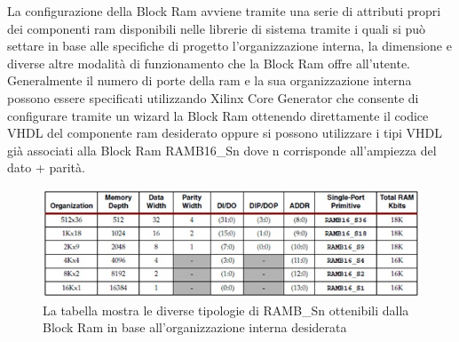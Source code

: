 La configurazione della Block Ram avviene tramite una serie di attributi propri dei componenti ram disponibili nelle librerie di sistema tramite i quali si pu\`o settare in base alle specifiche di progetto l'organizzazione interna, la dimensione e diverse altre modalità di funzionamento che la Block Ram offre all'utente.\\
Generalmente il numero di porte della ram e la sua organizzazione interna possono essere specificati utilizzando Xilinx Core Generator che consente di configurare tramite un wizard la Block Ram ottenendo direttamente il codice VHDL del componente ram desiderato oppure si possono utilizzare i tipi VHDL  gi\`a associati alla Block Ram RAMB16\_Sn dove n corrisponde all'ampiezza del dato + parit\`a.

\begin{figure}[!h]
\centering
 \includegraphics[scale=0.5]{img/blockRam/tabTipiRam.jpg}
\caption{La tabella mostra le diverse tipologie di RAMB\_Sn ottenibili dalla Block Ram in base all'organizzazione interna desiderata}
\label{fig:set_ass}
\end{figure}

